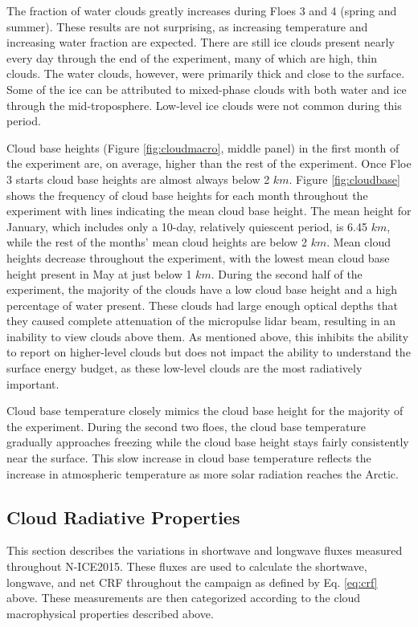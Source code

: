 The fraction of water clouds greatly increases during Floes 3 and 4 (spring and summer). These results are not surprising, as increasing temperature and increasing water fraction are expected. There are still ice clouds present nearly every day through the end of the experiment, many of which are high, thin clouds. The water clouds, however, were primarily thick and close to the surface. Some of the ice can be attributed to mixed-phase clouds with both water and ice through the mid-troposphere. Low-level ice clouds were not common during this period.

Cloud base heights (Figure \ref{fig:cloudmacro}, middle panel) in the first month of the experiment are, on average, higher than the rest of the experiment. Once Floe 3 starts cloud base heights are almost always below 2 $km$. Figure \ref{fig:cloudbase} shows the frequency of cloud base heights for each month throughout the experiment with lines indicating the mean cloud base height. The mean height for January, which includes only a 10-day, relatively quiescent period, is 6.45 $km$, while the rest of the months' mean cloud heights are below 2 $km$. Mean cloud heights decrease throughout the experiment, with the lowest mean cloud base height present in May at just below 1 $km$. During the second half of the experiment, the majority of the clouds have a low cloud base height and a high percentage of water present. These clouds had large enough optical depths that they caused complete attenuation of the micropulse lidar beam, resulting in an inability to view clouds above them. As mentioned above, this inhibits the ability to report on higher-level clouds but does not impact the ability to understand the surface energy budget, as these low-level clouds are the most radiatively important.

Cloud base temperature closely mimics the cloud base height for the majority of the experiment. During the second two floes, the cloud base temperature gradually approaches freezing while the cloud base height stays fairly consistently near the surface. This slow increase in cloud base temperature reflects the increase in atmospheric temperature as more solar radiation reaches the Arctic. 

\subsection{Cloud Radiative Properties}
This section describes the variations in shortwave and longwave fluxes measured throughout N-ICE2015. These fluxes are used to calculate the shortwave, longwave, and net CRF throughout the campaign as defined by Eq. \ref{eq:crf} above. These measurements are then categorized according to the cloud macrophysical properties described above.

